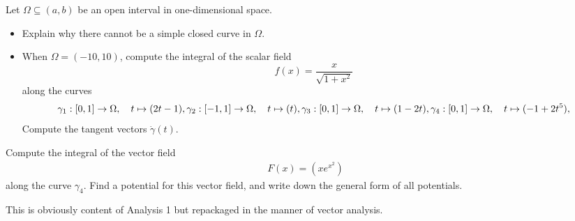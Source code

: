 \documentclass[11pt]{article}
\begin{document}
\begin{exercise}
    Let $\Omega \subseteq (a,b)$ be an open interval in one-dimensional space.
    \begin{itemize}
     \item Explain why there cannot be a simple closed curve in $\Omega$.
     \item When $\Omega = (-10,10)$, compute the integral of the scalar field 
     \[
        f(x) = \frac{x}{\sqrt{1+x^2}}
     \]
     along the curves 
     \[
        \gamma_1 : [0,1] \rightarrow \Omega, \quad t \mapsto (2t - 1),
        \\
        \gamma_2 : [-1,1] \rightarrow \Omega, \quad t \mapsto (t),
        \\
        \gamma_3 : [0,1] \rightarrow \Omega, \quad t \mapsto (1-2t),
        \\
        \gamma_4 : [0,1] \rightarrow \Omega, \quad t \mapsto (-1 + 2t^5),
     \]
     Compute the tangent vectors $\dot\gamma(t)$.
    \end{itemize}
    \item 
    Compute the integral of the vector field 
    \begin{align}
        F(x) = \left( x e^{x^2} \right)
    \end{align}
    along the curve $\gamma_4$. Find a potential for this vector field, and write down the general form of all potentials.
\end{exercise}
\begin{solution}
    This is obviously content of Analysis 1 but repackaged in the manner of vector analysis. 
\end{solution}
\end{document}

